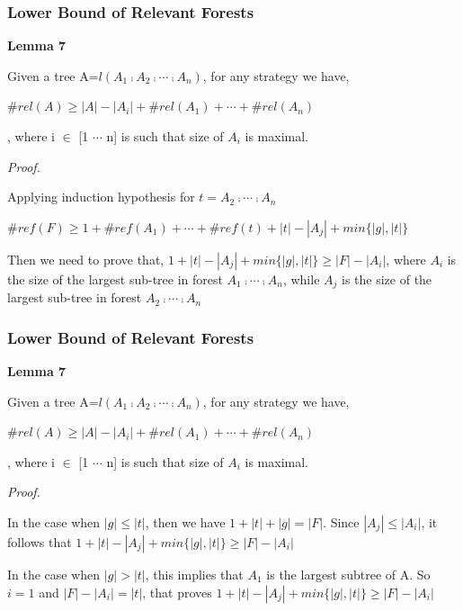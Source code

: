 \documentclass{beamer}
\begin{document}
\begin{frame}
\frametitle{Lower Bound of Relevant Forests}
\textbf{Lemma 7}

Given a tree A=$l(A_1 \comp A_2 \comp \cdots \comp A_n)$, for any strategy we have,

$\#rel(A) \geq \left\vert A \right\vert - \left\vert A_i \right\vert + \#rel(A_1) + \cdots + \#rel(A_n)$

, where i $\in$ [1 $\cdots$ n] is such that size of $A_i$ is maximal.

\vspace{12pt} 
\emph{Proof.}

Applying induction hypothesis for $t=A_2 \comp \cdots \comp A_n$

$\#ref(F) \geq 1 + \#ref(A_1) + \cdots + \#ref(t) + \left\vert t \right\vert - \left\vert A_j \right\vert + min\{\left\vert g \right\vert, \left\vert t \right\vert \}$

\vspace{6pt} 
Then we need to prove that, $1 + \left\vert t \right\vert - \left\vert A_j \right\vert + min\{\left\vert g \right\vert, \left\vert t \right\vert\} \geq \left\vert F \right\vert - \left\vert A_i \right\vert$, where $A_i$ is the size of the largest sub-tree in forest $A_1 \comp \cdots \comp A_n$, while $A_j$ is the size of the largest sub-tree in forest $A_2 \comp \cdots \comp A_n$ 
\end{frame}

\begin{frame}
\frametitle{Lower Bound of Relevant Forests}
\textbf{Lemma 7}

Given a tree A=$l(A_1 \comp A_2 \comp \cdots \comp A_n)$, for any strategy we have,

$\#rel(A) \geq \left\vert A \right\vert - \left\vert A_i \right\vert + \#rel(A_1) + \cdots + \#rel(A_n)$

, where i $\in$ [1 $\cdots$ n] is such that size of $A_i$ is maximal.

\vspace{12pt} 
\emph{Proof.}

In the case when $\left\vert g \right\vert \leq \left\vert t \right\vert$, then we have $1 + \left\vert t\right\vert + \left\vert g\right\vert = \left\vert F \right\vert$. Since $\left\vert A_j \right\vert \leq \left\vert A_i \right\vert$, it follows that  $1 + \left\vert t \right\vert - \left\vert A_j \right\vert + min\{\left\vert g \right\vert, \left\vert t \right\vert\} \geq \left\vert F \right\vert - \left\vert A_i \right\vert$

\vspace{6pt} 
In the case when $\left\vert g \right\vert > \left\vert t \right\vert$, this implies that $A_1$ is the largest subtree of A. So $i = 1$ and $\left\vert F \right\vert -\left\vert A_i\right\vert = \left\vert t \right\vert$, that proves $1 + \left\vert t \right\vert - \left\vert A_j \right\vert + min\{\left\vert g \right\vert, \left\vert t \right\vert\} \geq \left\vert F \right\vert - \left\vert A_i \right\vert$

\end{frame}
\end{document}
